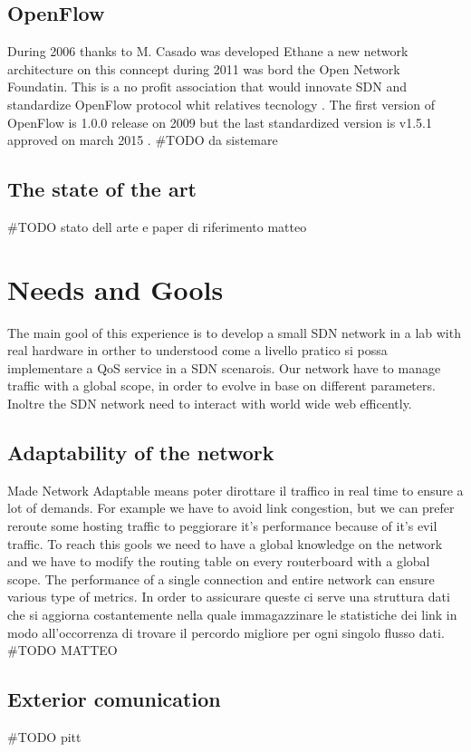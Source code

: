 \documentclass[conference,10pt]{IEEEtran}
\begin{document}
  \subsection{OpenFlow}
  During 2006 thanks to M. Casado was developed Ethane a new network architecture on this conncept during 2011 was bord the Open Network Foundatin.
  This is a no profit association that would innovate SDN and standardize OpenFlow protocol whit relatives tecnology \cite{ONF}.
  The first version of OpenFlow is 1.0.0 release on 2009 but the last standardized version is v1.5.1 approved on march 2015 \cite{ONF_report}.
  \#TODO da sistemare
  \subsection{The state of the art}
  \#TODO stato dell arte e paper di riferimento  matteo

\section{Needs and Gools}\label{sec:obb} %
The main gool of this experience is to develop a small SDN network in a lab with real hardware
in orther to understood come a livello pratico si possa implementare  a QoS service in a SDN scenarois.
Our network have to manage traffic with a global scope, in order to evolve in base on different parameters.
Inoltre the SDN network need to interact with world wide web efficently.
  \subsection{Adaptability of the network}
  Made Network Adaptable means poter dirottare il traffico in real time to ensure a lot of demands. For example we have to avoid link congestion,
  but we can prefer reroute some hosting traffic to peggiorare it's performance because of it's evil traffic.
  To reach this gools we need to have a global knowledge on the network and we have to modify the routing table on every routerboard with a
  global scope.
  The performance of a single connection and entire network can ensure various type of metrics.
  In order to assicurare queste ci serve una struttura dati che si aggiorna costantemente nella quale immagazzinare le statistiche dei link
  in modo all'occorrenza di trovare il percordo migliore per ogni singolo flusso dati.
  \#TODO MATTEO
  \subsection{Exterior comunication}
  \#TODO pitt
\end{document}
